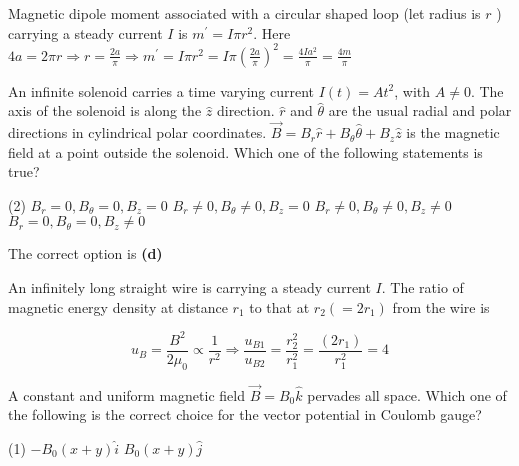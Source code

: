 \begin{enumerate}
\begin{answer}
		Magnetic dipole moment associated with a circular shaped loop (let radius is $r$ ) carrying a steady current $I$ is $m^{\prime}=I \pi r^{2}$.
		Here $4 a=2 \pi r \Rightarrow r=\frac{2 a}{\pi} \Rightarrow m^{\prime}=I \pi r^{2}=I \pi\left(\frac{2 a}{\pi}\right)^{2}=\frac{4 I a^{2}}{\pi}=\frac{4 m}{\pi}$	
	\end{answer}
	\begin{minipage}{\textwidth}
		\item An infinite solenoid carries a time varying current $I(t)=A t^{2}$, with $A \neq 0 .$ The axis of the solenoid is along the $\hat{z}$ direction. $\hat{r}$ and $\hat{\theta}$ are the usual radial and polar directions in cylindrical polar coordinates. $\vec{B}=B_{r} \hat{r}+B_{\theta} \hat{\theta}+B_{z} \hat{z}$ is the magnetic field at a point outside the solenoid. Which one of the following statements is true?
	\end{minipage}
	\begin{tasks}(2)
		\task[\textbf{A.}] $B_{r}=0, B_{\theta}=0, B_{z}=0$
		\task[\textbf{B.}]$B_{r} \neq 0, B_{\theta} \neq 0, B_{z}=0$
		\task[\textbf{C.}] $B_{r} \neq 0, B_{\theta} \neq 0, B_{z} \neq 0$
		\task[\textbf{D.}] $B_{r}=0, B_{\theta}=0, B_{z} \neq 0$
	\end{tasks}
	\begin{answer}
		The correct option is \textbf{(d)}	
	\end{answer}
	\begin{minipage}{\textwidth}
		\item An infinitely long straight wire is carrying a steady current $I$. The ratio of magnetic energy density at distance $r_{1}$ to that at $r_{2}\left(=2 r_{1}\right)$ from the wire is
	\end{minipage}
	\begin{answer}
		$$ u_{B}=\frac{B^{2}}{2 \mu_{0}} \propto \frac{1}{r^{2}} \Rightarrow \frac{u_{B 1}}{u_{B 2}}=\frac{r_{2}^{2}}{r_{1}^{2}}=\frac{\left(2 r_{1}\right)}{r_{1}^{2}}=4$$	
	\end{answer}
	\begin{minipage}{\textwidth}
		\item A constant and uniform magnetic field $\vec{B}=B_{0} \hat{k}$ pervades all space. Which one of the following is the correct choice for the vector potential in Coulomb gauge?
	\end{minipage}
	\begin{tasks}(1)
		\task[\textbf{A.}] $-B_{0}(x+y) \hat{i}$
		\task[\textbf{B.}]$B_{0}(x+y) \hat{j}$

\end{tasks}
\end{enumerate}
